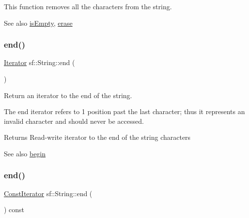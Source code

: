 This function removes all the characters from the string.

\begin{DoxySeeAlso}{See also}
\hyperlink{classsf_1_1_string_a2ba26cb6945d2bbb210b822f222aa7f6}{is\+Empty}, \hyperlink{classsf_1_1_string_aaa78a0a46b3fbe200a4ccdedc326eb93}{erase} 
\end{DoxySeeAlso}
\mbox{\label{classsf_1_1_string_ac823012f39cb6f61100418876e99d53b}} 
\subsubsection{\texorpdfstring{end()}{end()}\hspace{0.1cm}{\footnotesize\ttfamily [1/2]}}
{\footnotesize\ttfamily \hyperlink{classsf_1_1_string_ac90f2b7b28f703020f8d027e98806235}{Iterator} sf\+::\+String\+::end (\begin{DoxyParamCaption}{ }\end{DoxyParamCaption})}



Return an iterator to the end of the string. 

The end iterator refers to 1 position past the last character; thus it represents an invalid character and should never be accessed.

\begin{DoxyReturn}{Returns}
Read-\/write iterator to the end of the string characters
\end{DoxyReturn}
\begin{DoxySeeAlso}{See also}
\hyperlink{classsf_1_1_string_a8ec30ddc08e3a6bd11c99aed782f6dfe}{begin} 
\end{DoxySeeAlso}
\mbox{\label{classsf_1_1_string_af1ab4c82ff2bdfb6903b4b1bb78a8e5c}} 
\subsubsection{\texorpdfstring{end()}{end()}\hspace{0.1cm}{\footnotesize\ttfamily [2/2]}}
{\footnotesize\ttfamily \hyperlink{classsf_1_1_string_a8e18efc2e8464f6eb82818902d527efa}{Const\+Iterator} sf\+::\+String\+::end (\begin{DoxyParamCaption}{ }\end{DoxyParamCaption}) const}



